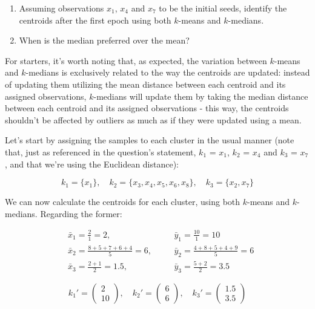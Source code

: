 \documentclass[12pt]{article}
\begin{document}
\begin{enumerate}[leftmargin=\labelsep]
\begin{tcolorbox}[enhanced jigsaw,halign=center,colback=bg,boxrule=0pt,arc=1pt]
    \begin{enumerate}
      \item Assuming observations $x_1$, $x_4$ and $x_7$ to be the initial seeds,
            identify the centroids after the first epoch using both $k$-means and $k$-medians.
      \item When is the median preferred over the mean?
    \end{enumerate}

  \end{tcolorbox}

  For starters, it's worth noting that, as expected, the variation between $k$-means
  and $k$-medians is exclusively related to the way the centroids are updated: instead
  of updating them utilizing the mean distance between each centroid and its assigned
  observations, $k$-medians will update them by taking the median distance between
  each centroid and its assigned observations - this way, the centroids shouldn't
  be affected by outliers as much as if they were updated using a mean.

  Let's start by assigning the samples to each cluster in the usual manner (note that, just as referenced
  in the question's statement, $k_1$ = $x_1$, $k_2$ = $x_4$ and $k_3$ = $x_7$, and that
  we're using the Euclidean distance):

  \begin{equation*}
    k_1 = \{x_1\}, \quad k_2 = \{x_3, x_4, x_5, x_6, x_8\}, \quad k_3 = \{x_2, x_7\}
  \end{equation*}

  We can now calculate the centroids for each cluster, using both $k$-means and $k$-medians.
  Regarding the former:

  \begin{equation*}
    \begin{aligned}
       & \bar{x}_1 = \frac{2}{1} = 2, \quad                 &  & \bar{y}_1 = \frac{10}{1} = 10               \\
       & \bar{x}_2 = \frac{8 + 5 + 7 + 6 + 4}{5} = 6, \quad &  & \bar{y}_2 = \frac{4 + 8 + 5 + 4 + 9}{5} = 6 \\
       & \bar{x}_3 = \frac{2 + 1}{2} = 1.5, \quad           &  & \bar{y}_3 = \frac{5 + 2}{2} = 3.5
    \end{aligned}
  \end{equation*}

  \begin{equation*}
    k_1' = \begin{pmatrix} 2 \\ 10 \end{pmatrix}, \quad
    k_2' = \begin{pmatrix} 6 \\ 6 \end{pmatrix}, \quad
    k_3' = \begin{pmatrix} 1.5 \\ 3.5 \end{pmatrix}
  \end{equation*}


\end{enumerate}
\end{document}
